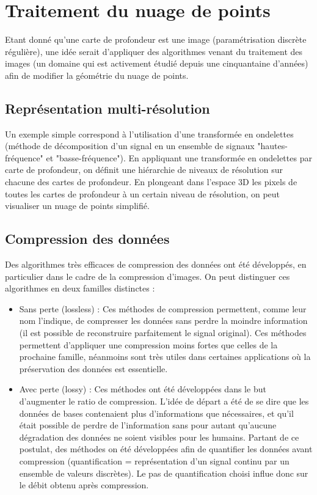 \documentclass{report}
\begin{document}
\section{Traitement du nuage de points}

Etant donné qu'une carte de profondeur est une image (paramétrisation discrète régulière), une idée serait d'appliquer des algorithmes venant du traitement des images (un domaine qui est activement étudié depuis une cinquantaine d'années) afin de modifier la géométrie du nuage de points.

\subsection{Représentation multi-résolution}

Un exemple simple correspond à l'utilisation d'une transformée en ondelettes (méthode de décomposition d'un signal en un ensemble de signaux "hautes-fréquence" et "basse-fréquence"). En appliquant une transformée en ondelettes par carte de profondeur, on définit une hiérarchie de niveaux de résolution sur chacune des cartes de profondeur.
En plongeant dans l'espace 3D les pixels de toutes les cartes de profondeur à un certain niveau de résolution, on peut visualiser un nuage de points simplifié.

\subsection{Compression des données}

Des algorithmes très efficaces de compression des données ont été développés, en particulier dans le cadre de la compression d'images.
On peut distinguer ces algorithmes en deux familles distinctes :
\begin{itemize}
	\item Sans perte (lossless) :
	Ces méthodes de compression permettent, comme leur nom l'indique, de compresser les données sans perdre la moindre information (il est possible de reconstruire parfaitement le signal original). Ces méthodes permettent d'appliquer une compression moins fortes que celles de la prochaine famille, néanmoins sont très utiles dans certaines applications où la préservation des données est essentielle.
	\item Avec perte (lossy) :
	Ces méthodes ont été développées dans le but d'augmenter le ratio de compression. L'idée de départ a été de se dire que les données de bases contenaient plus d'informations que nécessaires, et qu'il était possible de perdre de l'information sans pour autant qu'aucune dégradation des données ne soient visibles pour les humains.
	Partant de ce postulat, des méthodes on été développées afin de quantifier les données avant compression (quantification = représentation d'un signal continu par un ensemble de valeurs discrètes). Le pas de quantification choisi influe donc sur le débit obtenu après compression.
\end{itemize}
\end{document}
